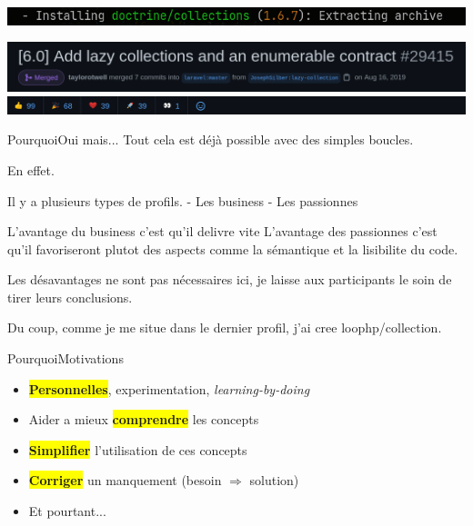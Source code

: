 \begin{frame}
    \includegraphics[width=\textwidth]{screenshots/Screenshot_20210520_104535.png}
\end{frame}

\begin{frame}
    \includegraphics[width=\textwidth]{screenshots/Screenshot_20210520_101402.png}
    \includegraphics[width=\textwidth]{screenshots/Screenshot_20210520_101458.png}
\end{frame}

\begin{frame}{Pourquoi}{Oui mais...}
    Tout cela est déjà possible avec des simples boucles.

    En effet.

    Il y a plusieurs types de profils.
    - Les business
    - Les passionnes

    L'avantage du business c'est qu'il delivre vite
    L'avantage des passionnes c'est qu'il favoriseront plutot
    des aspects comme la sémantique et la lisibilite du code.

    Les désavantages ne sont pas nécessaires ici, je laisse aux
    participants le soin de tirer leurs conclusions.

    Du coup, comme je me situe dans le dernier profil, j'ai cree
    loophp/collection.
\end{frame}

\begin{frame}{Pourquoi}{Motivations}
    \begin{itemize}[<+->]
        \item \colorbox{yellow}{\textbf{Personnelles}}, experimentation, \textit{learning-by-doing}
        \item Aider a mieux \colorbox{yellow}{\textbf{comprendre}} les concepts
        \item \colorbox{yellow}{\textbf{Simplifier}} l'utilisation de ces concepts
        \item \colorbox{yellow}{\textbf{Corriger}} un manquement (besoin $\Rightarrow$ solution)
        \item Et pourtant...
    \end{itemize}
\end{frame}

